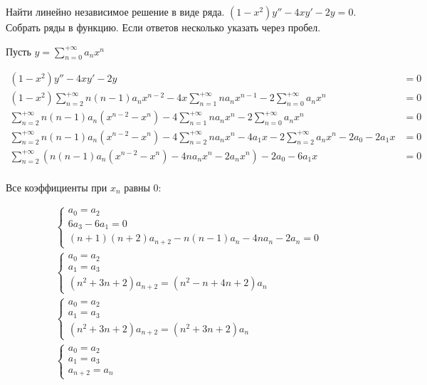 Найти линейно независимое решение в виде ряда. \((1 - x^2)y'' - 4xy' - 2y = 0\). Собрать ряды в функцию. Если ответов несколько указать через пробел.

Пусть \(y = \sum\limits_{n = 0}^{ +\infty} a_n x^n\)

\begin{align*}
    (1 - x^2)y'' - 4xy' - 2y                                                                                                                                                  & = 0 \\
    (1 - x^2)\sum\limits_{n = 2}^{ +\infty} n(n - 1) a_n x^{n - 2} - 4x\sum\limits_{n = 1}^{ +\infty} na_n x^{n - 1} - 2\sum\limits_{n = 0}^{ +\infty} a_n x^n                & = 0 \\
    \sum\limits_{n = 2}^{ +\infty} n(n - 1) a_n (x^{n - 2} - x^n) - 4\sum\limits_{n = 1}^{ +\infty} na_n x^n - 2\sum\limits_{n = 0}^{ +\infty} a_n x^n                        & = 0 \\
    \sum\limits_{n = 2}^{ +\infty} n(n - 1) a_n (x^{n - 2} - x^n) - 4\sum\limits_{n = 2}^{ +\infty} na_n x^n - 4a_1x - 2\sum\limits_{n = 2}^{ +\infty} a_n x^n - 2a_0 - 2a_1x & = 0 \\
    \sum\limits_{n = 2}^{ +\infty} \left( n(n - 1) a_n (x^{n - 2} - x^n) - 4 na_n x^n - 2 a_n x^n\right) - 2a_0 - 6a_1x                                                       & = 0 \\
\end{align*}

Все коэффициенты при \(x_n\) равны \(0\):

\begin{align*}
     & \begin{cases}
        a_0 = a_2       \\
        6a_3 - 6a_1 = 0 \\
        (n + 1)(n + 2) a_{n + 2} - n(n - 1)a_{n} - 4na_n - 2a_n = 0
    \end{cases} \\
     & \begin{cases}
        a_0 = a_2 \\
        a_1 = a_3 \\
        (n^2 + 3n + 2) a_{n + 2} = (n^2 - n + 4n + 2)a_n
    \end{cases} \\
     & \begin{cases}
        a_0 = a_2 \\
        a_1 = a_3 \\
        (n^2 + 3n + 2) a_{n + 2} = (n^2 + 3n + 2)a_n
    \end{cases} \\
     & \begin{cases}
        a_0 = a_2 \\
        a_1 = a_3 \\
        a_{n + 2} = a_n
    \end{cases} \\
\end{align*}

